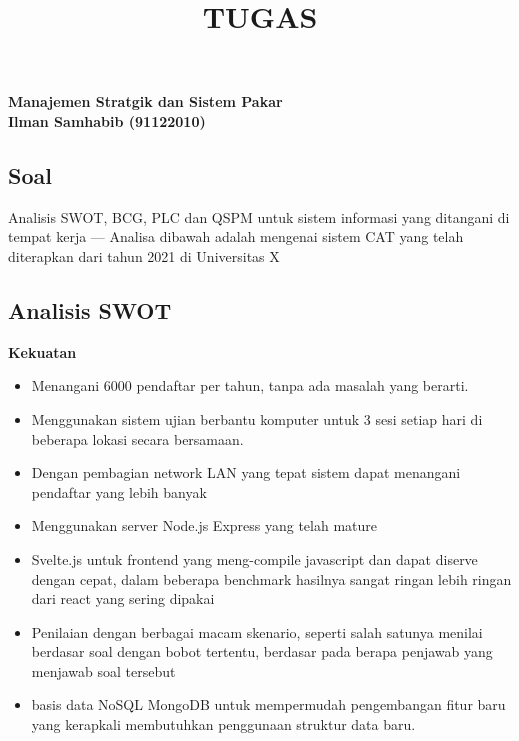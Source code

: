 \documentclass[12pt]{article}
\title{TUGAS }
\begin{document}

\begin{center}
  \textbf{Manajemen Stratgik dan Sistem Pakar}\\
  \textbf{Ilman Samhabib (91122010)}\\
\end{center}
\subsection*{Soal}
\noindent
Analisis SWOT, BCG, PLC dan QSPM untuk sistem informasi yang ditangani di tempat kerja --- Analisa dibawah adalah mengenai sistem CAT yang telah diterapkan dari tahun 2021 di Universitas X

\subsection*{Analisis SWOT}
\textbf{Kekuatan}
\begin{itemize}
  \item Menangani 6000 pendaftar per tahun, tanpa ada masalah yang berarti.
  \item Menggunakan sistem ujian berbantu komputer untuk 3 sesi setiap hari di beberapa lokasi secara bersamaan.
  \item Dengan pembagian network LAN yang tepat sistem dapat menangani pendaftar yang lebih banyak
  \item Menggunakan server Node.js Express yang telah mature
  \item Svelte.js untuk frontend  yang meng-compile javascript dan dapat diserve dengan cepat, dalam beberapa benchmark hasilnya sangat ringan lebih ringan dari react yang sering dipakai
  \item Penilaian dengan berbagai macam skenario, seperti salah satunya menilai berdasar soal dengan bobot tertentu, berdasar pada berapa penjawab yang menjawab soal tersebut
  \item  basis data NoSQL MongoDB untuk mempermudah pengembangan fitur baru yang kerapkali membutuhkan penggunaan struktur data baru.

\end{itemize}
\end{document}
